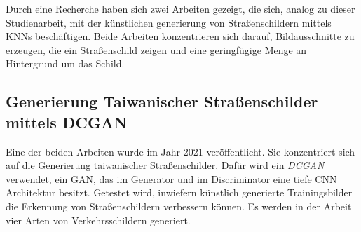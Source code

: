 Durch eine Recherche haben sich zwei Arbeiten gezeigt, die sich, analog zu dieser Studienarbeit, mit der künstlichen generierung von Straßenschildern mittels \acp{KNN} beschäftigen. Beide Arbeiten konzentrieren sich darauf, Bildausschnitte zu erzeugen, die ein Straßenschild zeigen und eine geringfügige Menge an Hintergrund um das Schild.

\subsection{Generierung Taiwanischer Straßenschilder mittels DCGAN}
Eine der beiden Arbeiten wurde im Jahr 2021 veröffentlicht. Sie konzentriert sich auf die Generierung taiwanischer Straßenschilder. Dafür wird ein \emph{DCGAN} verwendet, ein \ac{GAN}, das im Generator und im Discriminator eine tiefe \ac{CNN} Architektur besitzt. Getestet wird, inwiefern künstlich generierte Trainingsbilder die Erkennung von Straßenschildern verbessern können. Es werden in der Arbeit vier Arten von Verkehrsschildern generiert. \cite{taiwanGAN}


